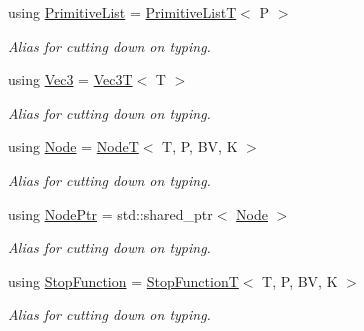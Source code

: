 \begin{DoxyCompactItemize}
\item 
\mbox{\label{classBVH_1_1NodeT_a19cce6e7fbe85eccb4a3718dd69f49b7}} 
using \hyperlink{classBVH_1_1NodeT_a19cce6e7fbe85eccb4a3718dd69f49b7}{Primitive\+List} = \hyperlink{namespaceBVH_aa1e753bda451b85cd5b948722a2ad7c7}{Primitive\+ListT}$<$ P $>$
\begin{DoxyCompactList}\small\item\em Alias for cutting down on typing. \end{DoxyCompactList}\item 
\mbox{\label{classBVH_1_1NodeT_a6fbb4308c5c55ee170c5f992df7ae1d0}} 
using \hyperlink{classBVH_1_1NodeT_a6fbb4308c5c55ee170c5f992df7ae1d0}{Vec3} = \hyperlink{classVec3T}{Vec3T}$<$ T $>$
\begin{DoxyCompactList}\small\item\em Alias for cutting down on typing. \end{DoxyCompactList}\item 
using \hyperlink{classBVH_1_1NodeT_ac52d9b56f082002c7f8be91062c40ff8}{Node} = \hyperlink{classBVH_1_1NodeT}{NodeT}$<$ T, P, BV, K $>$
\begin{DoxyCompactList}\small\item\em Alias for cutting down on typing. \end{DoxyCompactList}\item 
\mbox{\label{classBVH_1_1NodeT_a008f5c2c53adb1f5730d8478b48529b1}} 
using \hyperlink{classBVH_1_1NodeT_a008f5c2c53adb1f5730d8478b48529b1}{Node\+Ptr} = std\+::shared\+\_\+ptr$<$ \hyperlink{classBVH_1_1NodeT_ac52d9b56f082002c7f8be91062c40ff8}{Node} $>$
\begin{DoxyCompactList}\small\item\em Alias for cutting down on typing. \end{DoxyCompactList}\item 
\mbox{\label{classBVH_1_1NodeT_acbe56195affc439febe8aca84db308e3}} 
using \hyperlink{classBVH_1_1NodeT_acbe56195affc439febe8aca84db308e3}{Stop\+Function} = \hyperlink{namespaceBVH_afef1c5979c34a11d23b756cc09654bf9}{Stop\+FunctionT}$<$ T, P, BV, K $>$
\begin{DoxyCompactList}\small\item\em Alias for cutting down on typing. \end{DoxyCompactList}\item 

\end{DoxyCompactItemize}
